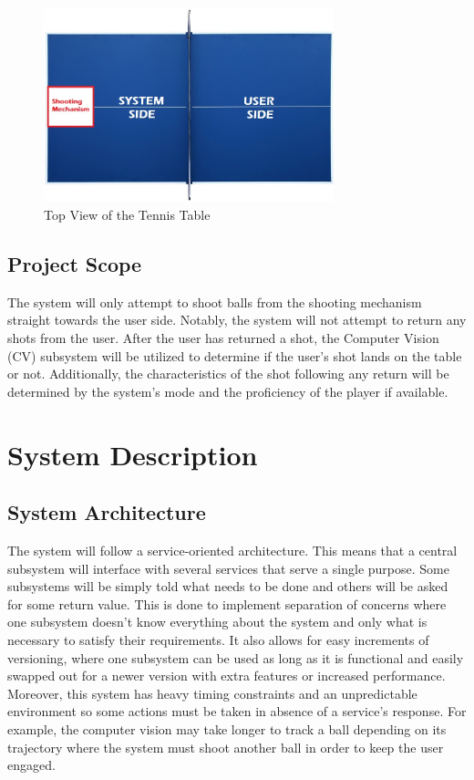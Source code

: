 \documentclass[11pt]{article}
\begin{document}
\begin{figure}[H]
   \centering
   \includegraphics[width=0.75\textwidth]{img/Table-Tennis-Top-View.png} %
   \caption{Top View of the Tennis Table}
   \label{fig:table-tennis-top-view}
\end{figure}
\subsection{Project Scope}
The system will only attempt to shoot balls from the shooting mechanism straight towards the user side. Notably, the system will not attempt to return any shots from the user. After the user has returned a shot, the Computer Vision (CV) subsystem will be utilized to determine if the user's shot lands on the table or not. Additionally, the characteristics of the shot following any return will be determined by the system's mode and the proficiency of the player if available.
\section{System Description}
\subsection{System Architecture}
The system will follow a service-oriented architecture. This means that a central subsystem will interface with several services that serve a single purpose. Some subsystems will be simply told what needs to be done and others will be asked for some return value. This is done to implement separation of concerns where one subsystem doesn't know everything about the system and only what is necessary to satisfy their requirements. It also allows for easy increments of versioning, where one subsystem can be used as long as it is functional and easily swapped out for a newer version with extra features or increased performance. Moreover, this system has heavy timing constraints and an unpredictable environment so some actions must be taken in absence of a service's response. For example, the computer vision may take longer to track a ball depending on its trajectory where the system must shoot another ball in order to keep the user engaged.
\end{document}
